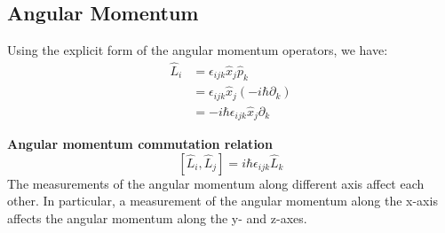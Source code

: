 \subsection{Angular Momentum}
Using the explicit form of the angular momentum operators, we have:
$$
\begin{aligned}
\hat{L}_{i} &=\epsilon_{i j k} \hat{x}_{j} \hat{p}_{k} \\
&=\epsilon_{i j k} \hat{x}_{j}\left(-i \hbar \partial_{k}\right) \\
&=-i \hbar \epsilon_{i j k} \hat{x}_{j} \partial_{k}
\end{aligned}
$$
\begin{qt}
\textbf{Angular momentum commutation relation}
\begin{equation}
\left[\hat{L}_{i}, \hat{L}_{j}\right]=i \hbar \epsilon_{i j k} \hat{L}_{k}
\end{equation}
The measurements of the angular momentum along different axis affect each other. In particular, a measurement of the angular momentum along the x-axis affects the angular momentum along the y- and z-axes.
\end{qt}


